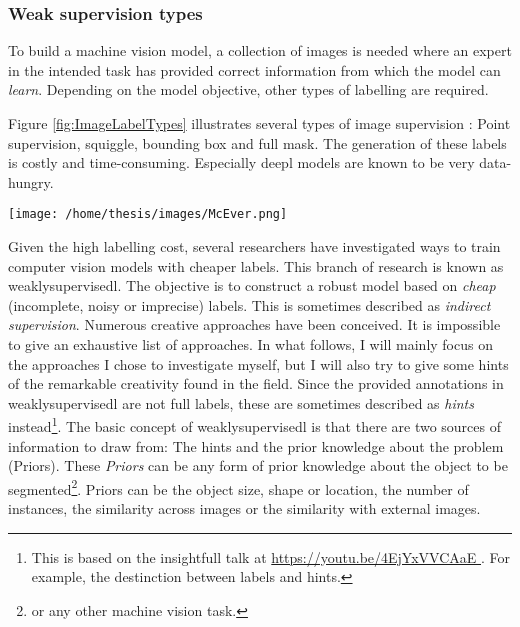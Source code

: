 \subsubsection{Weak supervision types}


To build a machine vision model, a collection of images is needed where an expert in the intended task has provided correct information from which the model can \textit{learn}.
Depending on the model objective, other types of labelling are required.


Figure \ref{fig:ImageLabelTypes} illustrates several types of image supervision : 
Point supervision, squiggle, bounding box and full mask.
The generation of these labels is costly and time-consuming.
Especially \gls{deepl} models are known to be very data-hungry. 

\begin{SCfigure}[][htb]
    \centering
    \texttt{[image: /home/thesis/images/McEver.png]}
    \caption{Four different annotation types \cite{McEver2020}: 
    On the top left the picture is point level annotated. The points are inflated for visibility.
    On the top right, squiggle annotation is used.
    The bottom left shows bounding box supervion.
    While the bottom right image is fully annotated.
    An image level label would indicate that there are multiple instances of \textit{person} and \textit{bike} in the image.
    \label{fig:ImageLabelTypes}}
\end{SCfigure}

Given the high labelling cost, several researchers have investigated ways to train computer vision models with cheaper labels.
This branch of research is known as \Gls{weaklysupervisedl}.
The objective is to construct a robust model based on \textit{cheap} (incomplete, noisy or imprecise) labels. 
This is sometimes described as \textit{indirect supervision}.
Numerous creative approaches have been conceived. 
It is impossible to give an exhaustive list of approaches. 
In what follows, I will mainly focus on the approaches I chose to investigate myself, but I will also try to give some hints of the remarkable creativity found in the field.
Since the provided annotations in \Gls{weaklysupervisedl} are not full labels, these are sometimes described as \textit{hints} instead\footnote{
    This is based on the insightfull talk at \url{ 
        https://youtu.be/4EjYxVVCAaE
    }. For example, the destinction between labels and hints.
}.
The basic concept of \Gls{weaklysupervisedl} is that there are two sources of information to draw from: The hints and the prior knowledge about the problem (Priors).
These \textit{Priors} can be any form of prior knowledge about the object to be segmented\footnote{or any other machine vision task.}.
Priors can be the object size, shape or location, the number of instances, the similarity across images or the similarity with external images.

